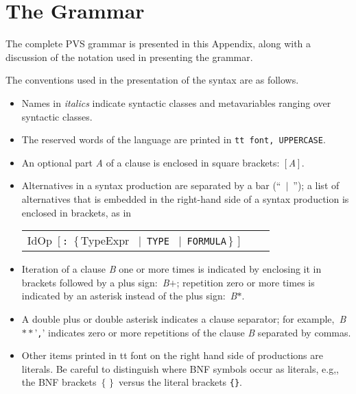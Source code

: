 \documentclass[12pt]{book}
\newenvironment{bnf}%
{\renewcommand{\arraystretch}{1.5}\small\it\begin{tabular*}{.8\textwidth}{lcl}}%
{\end{tabular*}\rm\renewcommand{\arraystretch}{1}}
\def\\{\let\stoken= } \\
\def\production #1#2{#1 & \is & #2 \\}
\newcommand {\is} {$::=$}
\newcommand {\choice} {$\ \mid\ $}
\newcommand {\opt}[1]{{$\,[\,$#1$\,]\,$}}
\newcommand {\brc}[1]{{$\,\{\,$#1$\,\}\,$}}
\newcommand {\rep}[1]{{\,{#1}$*$}}
\newcommand {\reps}[2]{{\,{#1}$**$'\lit{#2}'}}
\newcommand {\ite}[1]{{\,{#1}{\tiny  $+$}}}
\newcommand {\lit}[1]{{\tt #1}}
\begin{document}
\chapter{The Grammar}\label{grammar}

The complete PVS grammar is presented in this Appendix, along with a
discussion of the notation used in presenting the grammar.

The conventions used in the presentation of the syntax are as follows.

\begin{itemize}

\item Names in {\it italics\/} indicate syntactic classes and
metavariables ranging over syntactic classes.

\item The reserved words of the language are
      printed in \lit{tt font, UPPERCASE}.

\item An optional part {\it A\/} of a clause is enclosed in square brackets:
\opt{{\it A\/}}.

\item Alternatives in a syntax production are separated by a bar
(``\choice''); a list of alternatives that is embedded in the right-hand
side of a syntax production is enclosed in brackets, as in

\begin{bnf}
\production{ExportingName}
{IdOp \opt{\lit{:} \brc{TypeExpr \choice \lit{TYPE} \choice \lit{FORMULA}}}}
\end{bnf}


\item Iteration of a clause {\it B\/} one or more times is indicated by
enclosing it in brackets followed by a plus sign: \ite{{\it B\/}};
repetition zero or more times is indicated by an asterisk instead of the
plus sign: \rep{{\it B\/}}.

\item A double plus or double asterisk indicates a clause separator; for
example, \reps{{\it B\/}}{,} indicates zero or more repetitions of the
clause {\it B} separated by commas.

\item Other items printed in tt font on the right hand side of
      productions are literals.  Be careful to distinguish where BNF
symbols occur as literals, e.g,, the BNF brackets \brc{} versus the
literal brackets \lit{\{\}}.

\end{itemize}
\end{document}
